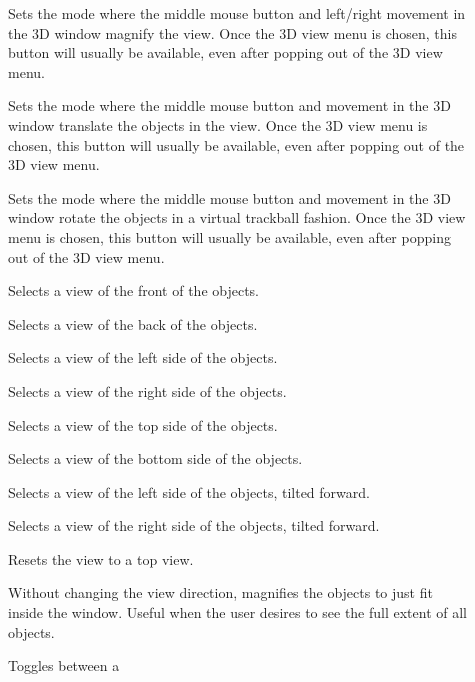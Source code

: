\begin{description}
\item[]
      Sets the mode where the middle mouse button and left/right movement
      in the 3D window magnify the view.
      Once the 3D view menu is chosen, this button will usually be
      available, even after popping out of the 3D view menu.
\item[]  
      Sets the mode where the middle mouse button and movement
      in the 3D window translate the objects in the view.
      Once the 3D view menu is chosen, this button will usually be
      available, even after popping out of the 3D view menu.
\item[]  Sets the mode where
      the middle mouse button and movement in the 3D window rotate
      the objects in a virtual trackball fashion.
      Once the 3D view menu is chosen, this button will usually be
      available, even after popping out of the 3D view menu.
\item[]  Selects a view of the front of
      the objects.
\item[]  Selects a view of the back of
      the objects.
\item[]  Selects a view of the left side of
      the objects.
\item[]  Selects a view of the right side of
      the objects.
\item[]  Selects a view of the top side of
      the objects.
\item[]  Selects a view of the bottom side of
      the objects.
\item[]  Selects a view of the left side of
      the objects, tilted forward.
\item[]  Selects a view of the right side of
      the objects, tilted forward.
\item[]  Resets the view to a top view.
\item[]  Without changing the view direction,
      magnifies the objects to just fit inside the window.  Useful when
      the user desires to see the full extent of all objects.
\item[]  Toggles between a

\end{description}
